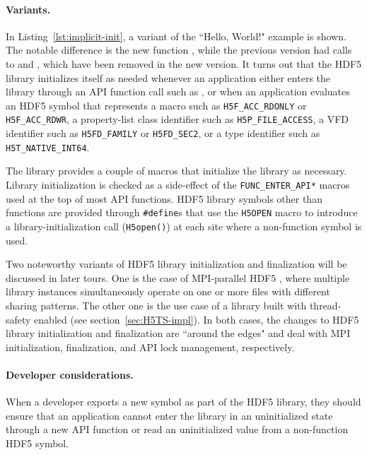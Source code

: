 \paragraph{Variants.} In Listing~\ref{lst:implicit-init}, a variant of the ``Hello, World!" example is shown. The notable difference is the new function , while the previous version had calls to  and , which have been removed in the new version. It turns out that the HDF5 library initializes itself as needed whenever an application either enters the library through an API function call such as , or when an application evaluates an HDF5 symbol that represents a macro such as \texttt{H5F\_ACC\_RDONLY} or \texttt{H5F\_ACC\_RDWR}, a property-list class identifier such as \texttt{H5P\_FILE\_ACCESS}, a VFD identifier such as \texttt{H5FD\_FAMILY} or \texttt{H5FD\_SEC2}, or a type identifier
such as \texttt{H5T\_NATIVE\_INT64}.

The library provides a couple of macros that initialize the library as necessary. Library initialization is checked as a side-effect of the \texttt{FUNC\_ENTER\_API*} macros used at the top of most API functions. HDF5 library symbols other than functions are provided through \texttt{\#define}s that use the \texttt{H5OPEN} macro to introduce a library-initialization call (\texttt{H5open()}) at each site where a non-function symbol is used.

Two noteworthy variants of HDF5 library initialization and finalization will be discussed in later tours. One is the case of MPI-parallel HDF5
, where multiple library instances simultaneously operate on one or more files with different sharing patterns. The other one is the use case of a library built with thread-safety enabled  (see section~\ref{sec:H5TS-impl}). In both cases, the changes to HDF5 library initialization and finalization are ``around the edges" and deal with MPI initialization, finalization, and API lock management, respectively.



\paragraph{Developer considerations.} When a developer exports a new symbol as part of the HDF5 library, they should ensure that an application cannot enter the library in an uninitialized state through a new API function or read an uninitialized value from a non-function HDF5 symbol.

